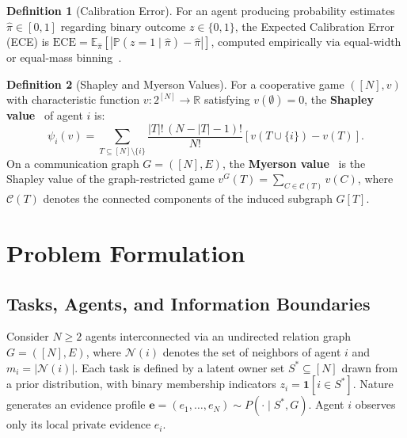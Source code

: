 \documentclass{article}
\theoremstyle{definition}
\newtheorem{definition}{Definition}
\begin{document}
\begin{definition}[Calibration Error]
For an agent producing probability estimates $\hat{\pi} \in [0, 1]$ regarding binary outcome $z \in \{0, 1\}$, the Expected Calibration Error (ECE) is $\mathrm{ECE} = \mathbb{E}_{\hat{\pi}}[|\mathbb{P}(z = 1 \mid \hat{\pi}) - \hat{\pi}|]$, computed empirically via equal-width or equal-mass binning~\cite{guo2017calibration}.
\end{definition}

\begin{definition}[Shapley and Myerson Values]
For a cooperative game $([N], v)$ with characteristic function $v: 2^{[N]} \to \mathbb{R}$ satisfying $v(\emptyset) = 0$, the \textbf{Shapley value}~\cite{shapley1953value} of agent $i$ is:
\begin{equation}
    \psi_i(v) = \sum_{T \subseteq [N] \setminus \{i\}} \frac{|T|!\, (N - |T| - 1)!}{N!} \left[ v(T \cup \{i\}) - v(T) \right].
\end{equation}
On a communication graph $G = ([N], E)$, the \textbf{Myerson value}~\cite{myerson1977graphs} is the Shapley value of the graph-restricted game $v^G(T) = \sum_{C \in \mathcal{C}(T)} v(C)$, where $\mathcal{C}(T)$ denotes the connected components of the induced subgraph $G[T]$.
\end{definition}

\section{Problem Formulation}
\label{sec:problem_formulation}

\subsection{Tasks, Agents, and Information Boundaries}
Consider $N \ge 2$ agents interconnected via an undirected relation graph $G = ([N], E)$, where $\mathcal{N}(i)$ denotes the set of neighbors of agent $i$ and $m_i = |\mathcal{N}(i)|$. Each task is defined by a latent owner set $S^* \subseteq [N]$ drawn from a prior distribution, with binary membership indicators $z_i = \mathbf{1}[i \in S^*]$. Nature generates an evidence profile $\mathbf{e} = (e_1, \dots, e_N) \sim P(\cdot \mid S^*, G)$. Agent $i$ observes only its local private evidence $e_i$.
\end{document}
